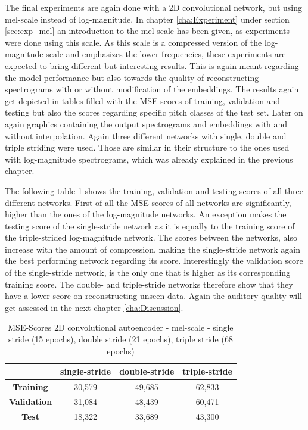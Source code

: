 The final experiments are again done with a 2D convolutional network, but using mel-scale instead of log-magnitude. In chapter \ref{cha:Experiment} under section \ref{sec:exp_mel} an introduction to the mel-scale has been given, as experiments were done using this scale. As this scale is a compressed version of the log-magnitude scale and emphasizes the lower frequencies, these experiments are expected to bring different but interesting results. This is again meant regarding the model performance but also towards the quality of reconstructing spectrograms with or without modification of the embeddings. The results again get depicted in tables filled with the MSE scores of training, validation and testing but also the scores regarding specific pitch classes of the test set. Later on again graphics containing the output spectrograms and embeddings with and without interpolation. Again three different networks with single, double and triple striding were used. Those are similar in their structure to the ones used with log-magnitude spectrograms, which was already explained in the previous chapter.

The following table \ref{tab:res_scores_2D_mel} shows the training, validation and testing scores of all three different networks. First of all the MSE scores of all networks are significantly, higher than the ones of the log-magnitude networks. An exception makes the testing score of the single-stride network as it is equally to the training score of the triple-strided log-magnitude network. The scores between the networks, also increase with the amount of compression, making the single-stride network again the best performing network regarding its score. Interestingly the validation score of the single-stride network, is the only one that is higher as its corresponding training score. The double- and triple-stride networks therefore show that they have a lower score on reconstructing unseen data. Again the auditory quality will get assessed in the next chapter \ref{cha:Discussion}.

\begin{table}[htb!]
    \centering
    \captionsetup{justification=Centering}
    \begin{tabular}{|c|c|c|c|}
        \hline
         & \textbf{single-stride} & \textbf{double-stride} & \textbf{triple-stride} \\
         \hline
        \textbf{Training} & 30,579 & 49,685 & 62,833 \\
        \hline
        \textbf{Validation} & 31,084 & 48,439 & 60,471\\
        \hline
        \textbf{Test} & 18,322 & 33,689 & 43,300\\
        \hline
    \end{tabular}
    \caption{MSE-Scores 2D convolutional autoencoder - mel-scale - single stride (15 epochs), double stride (21 epochs), triple stride (68 epochs)}
    \label{tab:res_scores_2D_mel}
\end{table}

